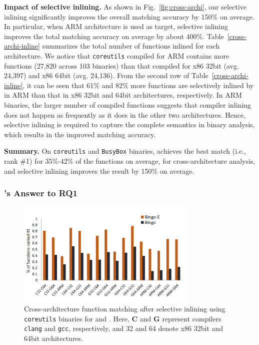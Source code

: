 \noindent\textbf{Impact of selective inlining.} As shown in Fig.~\ref{fig:cross-archi}, our selective inlining significantly improves the overall matching accuracy by 150\% on average. In particular, when ARM architecture is used as target, selective inlining improves the total matching accuracy on average by about 400\%. Table~\ref{cross-archi-inline} summarizes the total number of functions inlined for each architecture.  We notice that \texttt{coreutils} compiled for ARM contains more functions (27,820 across 103 binaries) than that compiled for x86 32bit (avg. 24,397) and x86 64bit (avg. 24,136). From the second row of Table~\ref{cross-archi-inline}, it can be seen that 61\% and 82\% more functions are selectively inlined by \tool in ARM than that in x86 32bit and 64bit architectures, respectively. In ARM binaries, the larger number of compiled functions suggests that compiler inlining does not happen as frequently as it does in the other two architectures.  Hence,   selective inlining is required to capture the complete semantics in binary analysis, which results in the improved matching accuracy.

\noindent\textbf{Summary.} On \texttt{coreutils} and \texttt{BusyBox} binaries, \tool achieves the best match (i.e., rank \#1) for 35\%-42\% of the functions on average, for cross-architecture analysis, and selective inlining improves the result by 150\% on average.

\subsubsection{\toolNew's Answer to RQ1}\label{sec:evaluation_rq1.2}

\begin{figure}[t]
\begin{center}%
\includegraphics[height=5cm]{srj-figures/cross-archi-new.pdf} %
\caption{Cross-architecture function matching after selective inlining using \texttt{coreutils} binaries for \tool and \toolNew. Here, \textbf{C} and \textbf{G} represent  compilers \texttt{clang} and \texttt{gcc}, respectively, and 32 and 64 denote x86 32bit and 64bit architectures. }
\label{fig:cross-archi-new}
\end{center}
\end{figure}



